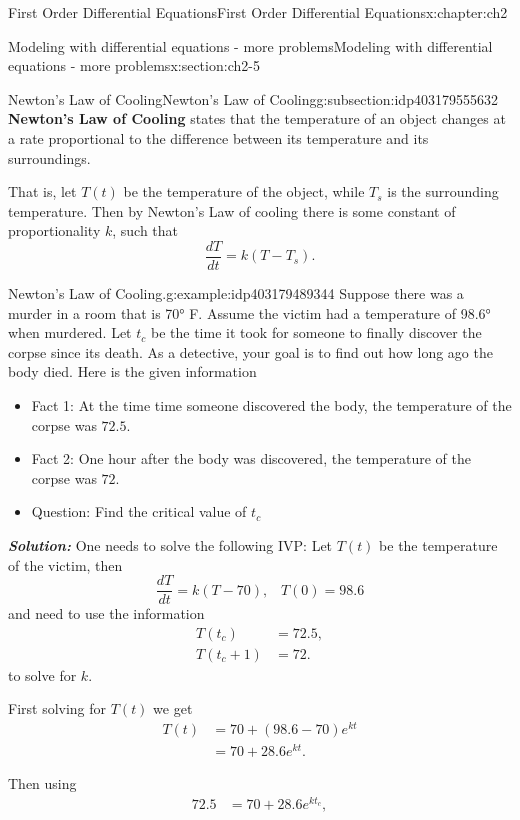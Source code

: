 \documentclass[oneside,10pt,]{book}
\newcommand{\alert}[1]{\textbf{\textit{#1}}}
\newcommand{\terminology}[1]{\textbf{#1}}
\numberwithin{equation}{section}
\numberwithin{equation}{section}
\newcommand{\amp}{&}
\begin{document}
\begin{chapterptx}{First Order Differential Equations}{}{First Order Differential Equations}{}{}{x:chapter:ch2}
\begin{sectionptx}{Modeling with differential equations - more problems}{}{Modeling with differential equations - more problems}{}{}{x:section:ch2-5}
%
\begin{subsectionptx}{Newton's Law of Cooling}{}{Newton's Law of Cooling}{}{}{g:subsection:idp403179555632}
\terminology{Newton's Law of Cooling} states that the temperature of an object changes at a rate proportional to the difference between its temperature and its surroundings.%
\par
That is, let \(T(t)\) be the temperature of the object, while \(T_{s}\) is the surrounding temperature. Then by Newton's Law of cooling there is some constant of proportionality \(k\), such that%
\begin{equation*}
\frac{dT}{dt}=k\left(T-T_{s}\right).
\end{equation*}
%
\begin{example}{Newton's Law of Cooling.}{g:example:idp403179489344}%
Suppose there was a murder in a room that is 70° F. Assume the victim had a temperature of 98.6° when murdered. Let \(t_{c}\) be the time it took for someone to finally discover the corpse since its death. As a detective, your goal is to find out how long ago the body died. Here is the given information %
\begin{itemize}[label=\textbullet]
\item{}Fact 1: At the time time someone discovered the body, the temperature of the corpse was \(72.5\).%
\item{}Fact 2: One hour after the body was discovered, the temperature of the corpse was \(72\).%
\item{}Question: Find the critical value of \(t_{c}\)%
\end{itemize}
\alert{Solution:} One needs to solve the following IVP: Let \(T(t)\) be the temperature of the victim, then%
\begin{equation*}
\frac{dT}{dt}=k\left(T-70\right),\,\,\,\,\,T\left(0\right)=98.6
\end{equation*}
and need to use the information%
\begin{align*}
T(t_{c}) \amp =72.5,\\
T(t_{c}+1) \amp =72.
\end{align*}
to solve for \(k\).%
\par
First solving for \(T(t)\) we get%
\begin{align*}
T(t) \amp =70+\left(98.6-70\right)e^{kt}\\
\amp =70+28.6e^{kt}.
\end{align*}
%
\par
Then using%
\begin{align*}
72.5 \amp =70+28.6e^{kt_{c}},\\

\end{align*}
\end{example}
\end{subsectionptx}
\end{sectionptx}
\end{chapterptx}
\end{document}
